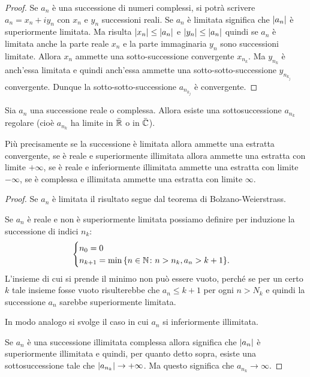 \begin{proof}
Se $a_n$ è una successione di numeri complessi, si potrà scrivere
$a_n = x_n + i y_n$ con
$x_n$ e $y_n$ successioni reali. Se $a_n$ è limitata significa che ${\left|a_n\right|}$
è superiormente limitata. Ma risulta ${\left|x_n\right|} \le {\left|a_n\right|}$ e
${\left|y_n\right|}\le {\left|a_n\right|}$ quindi se $a_n$ è limitata anche la parte reale
$x_n$ e la parte immaginaria $y_n$ sono successioni limitate.
Allora $x_n$ ammette una sotto-successione convergente $x_{n_k}$.
Ma $y_{n_k}$ è anch'essa limitata e quindi anch'essa ammette una
sotto-sotto-successione $y_{n_{k_j}}$ convergente.
Dunque la sotto-sotto-successione $a_{n_{k_j}}$ è convergente.
\end{proof}

\begin{corollary}\label{cor:12394}
  Sia $a_n$ una successione reale o complessa.
  Allora esiste
  una sottosuccessione $a_{n_k}$ regolare (cioè $a_{n_k}$ ha limite in $\bar {\mathbb R}$ o in $\bar {\mathbb C}$).

  Più precisamente se la successione è limitata allora ammette una estratta convergente,
  se è reale e superiormente illimitata allora ammette
  una estratta con limite $+\infty$,
  se è reale e inferiormente illimitata ammette
  una estratta con limite $-\infty$,
  se è complessa e illimitata ammette
  una estratta con limite $\infty$.
\end{corollary}
%
\begin{proof}
  Se $a_n$ è limitata il risultato segue dal teorema di Bolzano-Weierstrass.

  Se $a_n$ è reale e non è superiormente limitata
  possiamo definire per induzione la successione di indici $n_k$:
  \[
  \begin{cases}
      n_0 = 0 \\
      n_{k+1} = \min{\left\{ n \in \mathbb N\colon n>n_k, a_n > k+1 \right\}}.
  \end{cases}
  \]
  L'insieme di cui si prende il minimo non può essere vuoto,
  perché se per un certo $k$ tale insieme fosse vuoto
  risulterebbe che $a_n\le k+1$ per ogni $n>N_k$ e quindi
  la successione $a_n$ sarebbe superiormente limitata.

  In modo analogo si svolge il caso in cui $a_n$ si inferiormente illimitata.

  Se $a_n$ è una successione illimitata complessa allora significa che
  ${\left|a_n\right|}$ è superiormente illimitata e quindi, per quanto detto sopra,
  esiste una sottosuccessione tale che ${\left|a_{n_k}\right|}\to +\infty$.
  Ma questo significa che $a_{n_k} \to \infty$.
\end{proof}

